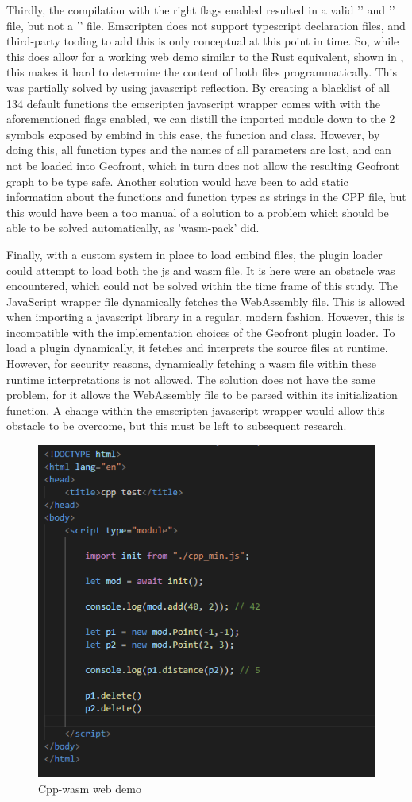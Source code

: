 Thirdly, the compilation with the right flags enabled resulted in a valid '' and '' file, but not a '' file.
Emscripten does not support typescript declaration files, and third-party tooling to add this is only conceptual at this point in time. 
So, while this does allow for a working web demo similar to the Rust equivalent, shown in , this makes it hard to determine the content of both files programmatically. 
This was partially solved by using javascript reflection.
By creating a blacklist of all 134 default functions the emscripten javascript wrapper comes with with the aforementioned flags enabled, we can distill the imported module down to the 2 symbols exposed by embind in this case, the  function and  class.
However, by doing this, all function types and the names of all parameters are lost, and can not be loaded into Geofront, which in turn does not allow the resulting Geofront graph to be type safe. 
Another solution would have been to add static information about the functions and function types as strings in the CPP file, but this would have been a too manual of a solution to a problem which should be able to be solved automatically, as 'wasm-pack' did.

Finally, with a custom system in place to load embind files, the plugin loader could attempt to load both the js and wasm file. 
It is here were an obstacle was encountered, which could not be solved within the time frame of this study. 
The JavaScript wrapper file dynamically fetches the WebAssembly file. 
This is allowed when importing a javascript library in a regular, modern fashion. 
However, this is incompatible with the implementation choices of the Geofront plugin loader. 
To load a plugin dynamically, it fetches and interprets the source files at runtime. 
However, for security reasons, dynamically fetching a wasm file within these runtime interpretations is not allowed.
The  solution does not have the same problem, for it allows the WebAssembly file to be parsed within its initialization function.
A change within the emscripten javascript wrapper would allow this obstacle to be overcome, but this must be left to subsequent research. 

\begin{figure}
  \graphicspath{{../../assets/images/6.1.3}}
  \centering
  \includegraphics[width=0.50\linewidth]{demo.PNG}
  \caption[loading a plugin]{Cpp-wasm web demo}
  \label{fig:min-cpp-demo}
\end{figure}

